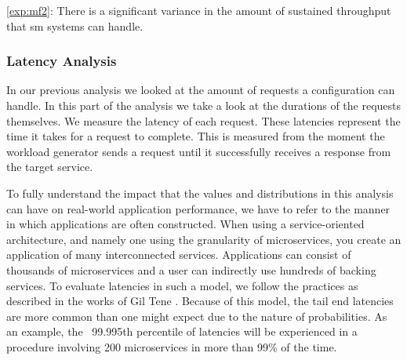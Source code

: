 \begin{shaded*}
    \noindent
    \ref{exp:mf2}: 
    There is a significant variance in the amount of sustained throughput that \gls{sm} systems can handle.
\end{shaded*}

\subsubsection{Latency Analysis}
\label{sec:experiments:results:per-experiment:01:latency}

In our previous analysis we looked at the amount of requests a configuration can handle. In this part of the analysis we take a look at the durations of the requests themselves. We measure the latency of each request. These latencies represent the time it takes for a request to complete. This is measured from the moment the workload generator sends a request until it successfully receives a response from the target service.

To fully understand the impact that the values and distributions in this analysis can have on real-world application performance, we have to refer to the manner in which applications are often constructed. When using a service-oriented architecture, and namely one using the granularity of microservices, you create an application of many interconnected services. Applications can consist of thousands of microservices \cite{design-example-microservices, netflix-microservices-cost} and a user can indirectly use hundreds of backing services. To evaluate latencies in such a model, we follow the practices as described in the works of Gil Tene \cite{Tene2015-measure-latency}. Because of this model, the tail end latencies are more common than one might expect due to the nature of probabilities. As an example, the ~99.995th percentile of latencies will be experienced in a procedure involving 200 microservices in more than 99\% of the time. 



